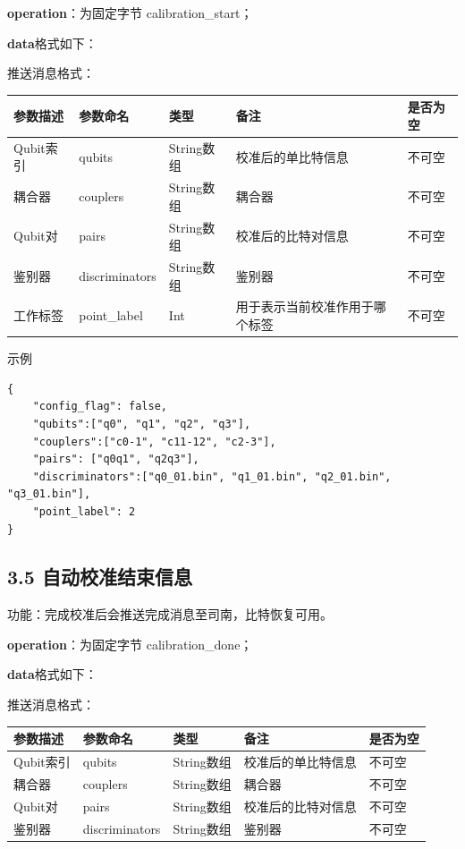 \documentclass{ctexart}
\begin{document}
\textbf{operation}：为固定字节 calibration_start；

\textbf{data}格式如下：

推送消息格式：

\begin{longtable}{|l|l|l|l|l|}
\hline
\textbf{\textbf{参数描述}} & \textbf{\textbf{参数命名}} & \textbf{\textbf{类型}} & \textbf{\textbf{备注}} & \textbf{\textbf{是否为空}} \\
\hline
Qubit索引 & qubits & String数组 & 校准后的单比特信息 & 不可空 \\
耦合器 & couplers & String数组 & 耦合器 & 不可空 \\
Qubit对 & pairs & String数组 & 校准后的比特对信息 & 不可空 \\
鉴别器 & discriminators & String数组 & 鉴别器 & 不可空 \\
工作标签 & point_label & Int & 用于表示当前校准作用于哪个标签 & 不可空 \\
\hline
\end{longtable}

示例

\begin{verbatim}{
    "config_flag": false,
    "qubits":["q0", "q1", "q2", "q3"],
    "couplers":["c0-1", "c11-12", "c2-3"],
    "pairs": ["q0q1", "q2q3"],
    "discriminators":["q0_01.bin", "q1_01.bin", "q2_01.bin", "q3_01.bin"],
    "point_label": 2
}\end{verbatim}

\subsection{3.5 自动校准结束信息}

功能：完成校准后会推送完成消息至司南，比特恢复可用。

\textbf{operation}：为固定字节 calibration_done；

\textbf{data}格式如下：

推送消息格式：

\begin{longtable}{|l|l|l|l|l|}
\hline
\textbf{\textbf{参数描述}} & \textbf{\textbf{参数命名}} & \textbf{\textbf{类型}} & \textbf{\textbf{备注}} & \textbf{\textbf{是否为空}} \\
\hline
Qubit索引 & qubits & String数组 & 校准后的单比特信息 & 不可空 \\
耦合器 & couplers & String数组 & 耦合器 & 不可空 \\
Qubit对 & pairs & String数组 & 校准后的比特对信息 & 不可空 \\
鉴别器 & discriminators & String数组 & 鉴别器 & 不可空 \\
\hline
\end{longtable}
\end{document}
